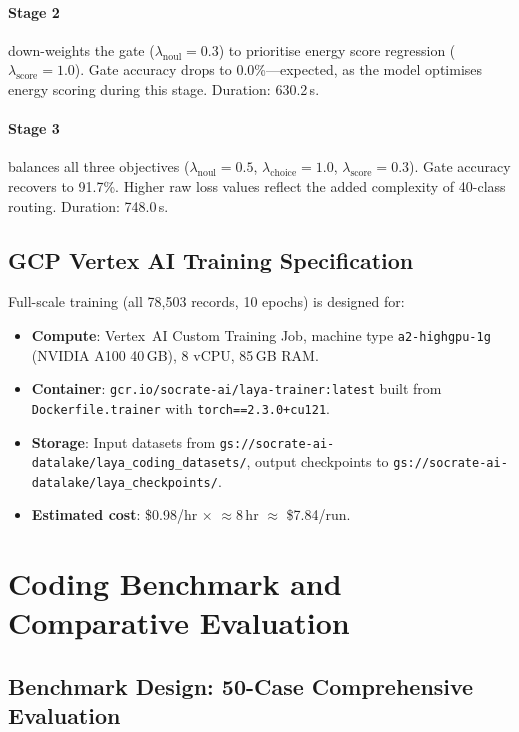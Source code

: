 \documentclass[conference]{IEEEtran}
\begin{document}
\paragraph{Stage 2} down-weights the gate ($\lambda_\text{noul}{=}0.3$) to prioritise
energy score regression ($\lambda_\text{score}{=}1.0$). Gate accuracy drops to 0.0\%—expected,
as the model optimises energy scoring during this stage. Duration: 630.2\,s.

\paragraph{Stage 3} balances all three objectives ($\lambda_\text{noul}{=}0.5$,
$\lambda_\text{choice}{=}1.0$, $\lambda_\text{score}{=}0.3$). Gate accuracy recovers to 91.7\%.
Higher raw loss values reflect the added complexity of 40-class routing. Duration: 748.0\,s.

\subsection{GCP Vertex AI Training Specification}

Full-scale training (all 78{,}503 records, 10 epochs) is designed for:
\begin{itemize}
  \item \textbf{Compute}: Vertex~AI Custom Training Job, machine type \texttt{a2-highgpu-1g}
        (NVIDIA A100 40\,GB), 8 vCPU, 85\,GB RAM.
  \item \textbf{Container}: \texttt{gcr.io/socrate-ai/laya-trainer:latest}
        built from \texttt{Dockerfile.trainer} with \texttt{torch==2.3.0+cu121}.
  \item \textbf{Storage}: Input datasets from
        \texttt{gs://socrate-ai-datalake/laya\_coding\_datasets/},
        output checkpoints to \texttt{gs://socrate-ai-datalake/laya\_checkpoints/}.
  \item \textbf{Estimated cost}: \$0.98/hr $\times$ $\approx$8\,hr $\approx$ \$7.84/run.
\end{itemize}

\section{Coding Benchmark and Comparative Evaluation}
\label{sec:benchmark}

\subsection{Benchmark Design: 50-Case Comprehensive Evaluation}
\end{document}
